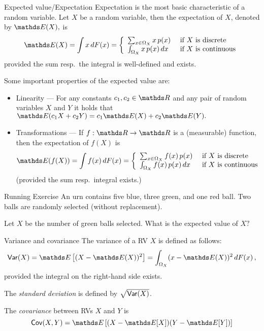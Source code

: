 \documentclass[11pt,compress,t,notes=noshow, xcolor=table]{beamer}
\begin{document}
\begin{frame}[t]{Expected value/Expectation} 
%	
	Expectation is the most basic characteristic of a random variable. Let $X$ be a random variable, then the expectation of $X$, denoted by $\E(X),$ is 
	$$	\E(X) = \int x \, dF(x) = \left\{ \begin{array}{ll}
		\sum_{x \in \Omega_X} x \, p(x) & \text{ if } X \text{ is discrete} \\
		\int_{\Omega_X} x \, p(x) \, dx& \text{ if } X \text{ is continuous} 
	\end{array} \right.  	$$
 provided the sum resp.\ the integral is well-defined and exists.
	
	Some important properties of the expected value are:
	\begin{itemize}
		\item Linearity --- For any constants $c_1,c_2 \in \R$ and any pair of random variables $X$ and $Y$ it holds that $ \E(c_1 X + c_2 Y) = c_1 \E(X) + c_2 \E(Y).$
		\item Transformations --- If $f:\R \to \R$  is a (measurable) function, then the expectation of $f(X)$ is 
		$$\E(f(X)) = \int f(x) \, dF(x) = \left\{ \begin{array}{ll}
			\sum_{x \in \Omega_X} f(x) \, p(x) & \text{ if } X \text{ is discrete} \\
			\int_{\Omega_X} f(x) \, p(x) \, dx& \text{ if } X \text{ is continuous} 
		\end{array} \right.  	$$   
		{\tiny (provided the sum resp.\ integral exists.)}
	\end{itemize}
\end{frame}


\begin{vbframe}{Running Exercise}  
	An urn contains five blue, three green, and one red ball. Two balls are randomly selected (without replacement).
	
	\lz
	
	
	
	Let $X$ be the number of green balls selected. What is the expected value of $X?$
	
	 
	
	
	
\end{vbframe}


\begin{vbframe}{Variance and covariance}
%	 
		The variance of a RV $X$ is defined as follows:
		$$
		\var(X) = \E \left[ (X - \E(X))^2 \right] = \int_{\Omega_X} (x-\E(X))^2  \, dF(x)  \, ,
		$$
		provided the integral on the right-hand side exists. 
		
		\lz
		 
		The \emph{standard deviation} is defined by $\sqrt{\mathsf{Var}(X)}$.
		
		
		\lz
		 
		The \emph{covariance} between RVs $X$ and $Y$ is  
		$$
		\cov(X,Y) = \E \left[  (X- \E[X]) (Y - \E[Y]) \right]
		$$
%		 
\end{vbframe}
\end{document}
